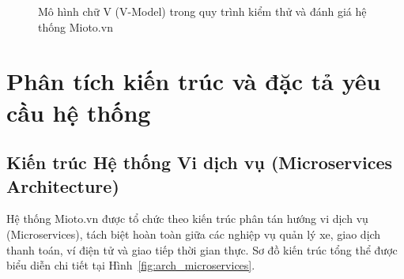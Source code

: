 \documentclass[12pt,a4paper,oneside]{report}
\begin{document}
\begin{figure}[htbp]
{
  }
  \caption{Mô hình chữ V (V-Model) trong quy trình kiểm thử và đánh giá hệ thống Mioto.vn}
  \label{fig:v_model}
\end{figure}

\chapter{Phân tích kiến trúc và đặc tả yêu cầu hệ thống}

\section{Kiến trúc Hệ thống Vi dịch vụ (Microservices Architecture)}
Hệ thống Mioto.vn được tổ chức theo kiến trúc phân tán hướng vi dịch vụ (Microservices), tách biệt hoàn toàn giữa các nghiệp vụ quản lý xe, giao dịch thanh toán, ví điện tử và giao tiếp thời gian thực. Sơ đồ kiến trúc tổng thể được biểu diễn chi tiết tại Hình~\ref{fig:arch_microservices}.
\end{document}
